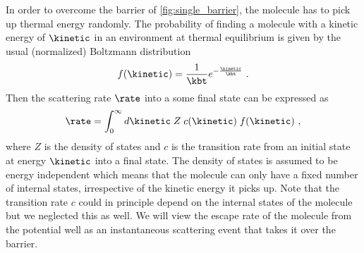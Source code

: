 In order to overcome the barrier of \cref{fig:single_barrier}, the molecule has to pick up thermal energy
randomly. The probability of finding a molecule with a kinetic energy of $\kinetic$ in an environment at
thermal equilibrium is given by the usual (normalized) Boltzmann distribution
%
\begin{align*}
    f(\kinetic) = \frac{1}{\kbt} e^{-\frac{\kinetic}{\kbt}}
    \text{ .}
\end{align*}
%
Then the scattering rate $\rate$ into a some final state can be expressed as
%
\begin{align}\label{eq:rate}
    \rate = \int_0^\infty d\kinetic\; Z \;c(\kinetic)\;f(\kinetic)
    \text{ ,}
\end{align}
%
where $Z$ is the density of states and $c$ is the transition rate from an initial state at energy $\kinetic$
into a final state. The density of states is assumed to be energy independent which means that the molecule
can only have a fixed number of internal states, irrespective of the kinetic energy it picks up. Note that the
transition rate $c$ could in principle depend on the internal states of the molecule but we neglected this as
well. We will view the escape rate of the molecule from the potential well as an instantaneous scattering
event that takes it over the barrier.

